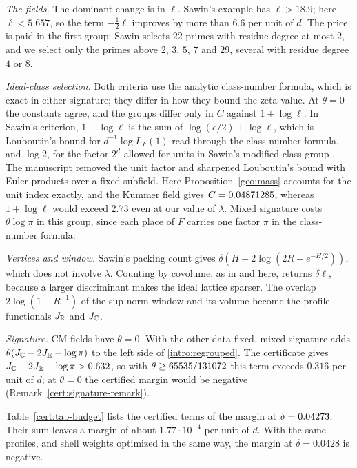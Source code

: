 \emph{The fields.} The dominant change is in $\ell$. Sawin's example has
$\ell>18.9$; here $\ell<5.657$, so the term $-\frac12\ell$ improves by
more than $6.6$ per unit of $d$. The price is paid in the first group:
Sawin selects $22$ primes with residue degree at most $2$, and we select
only the primes above $2$, $3$, $5$, $7$ and $29$, several with residue
degree $4$ or $8$.

\emph{Ideal-class selection.} Both criteria use the analytic class-number
formula, which is exact in either signature; they differ in how they
bound the zeta value. At $\theta=0$ the constants agree, and the groups
differ only in $C$ against $1+\log\ell$. In Sawin's criterion,
$1+\log\ell$ is the sum of $\log(e/2)+\log\ell$, which is Louboutin's
bound \cite[Corollary~3]{Louboutin2000} for $d^{-1}\log L_F(1)$ read
through the class-number formula, and $\log2$, for the factor $2^d$
allowed for units in Sawin's modified class group
\cite[Lemma~6]{Sawin2026}. The manuscript \cite{Naslund0358} removed the
unit factor and sharpened Louboutin's bound with Euler products over a
fixed subfield. Here Proposition~\ref{geo:mass} accounts for the unit
index exactly, and the Kummer field gives $C=0.04871285$, whereas
$1+\log\ell$ would exceed $2.73$ even at our value of $\lambda$. Mixed
signature costs $\theta\log\pi$ in this group, since each place of $F$
carries one factor $\pi$ in the class-number formula.

\emph{Vertices and window.} Sawin's packing count gives
$\delta(H+2\log(2R+e^{-H/2}))$, which does not involve $\lambda$.
Counting by covolume, as in \cite{Naslund0358} and here, returns
$\delta\ell$, because a larger discriminant makes the ideal lattice
sparser. The overlap $2\log(1-R^{-1})$ of the sup-norm window and its
volume become the profile functionals $J_\mathbb R$ and $J_\mathbb C$.

\emph{Signature.} CM fields have $\theta=0$. With the other data fixed,
mixed signature adds $\theta(J_\mathbb C-2J_\mathbb R-\log\pi)$ to the left side of
\eqref{intro:regrouped}. The certificate gives
$J_\mathbb C-2J_\mathbb R-\log\pi>0.632$, so with $\theta\ge65535/131072$ this term
exceeds $0.316$ per unit of $d$; at $\theta=0$ the certified margin
would be negative (Remark~\ref{cert:signature-remark}).

Table~\ref{cert:tab-budget} lists the certified terms of the margin at
$\delta=0.04273$. Their sum leaves a margin of about
$1.77\cdot10^{-4}$ per unit of $d$. With the same profiles, and shell
weights optimized in the same way, the margin at $\delta=0.0428$ is
negative.


